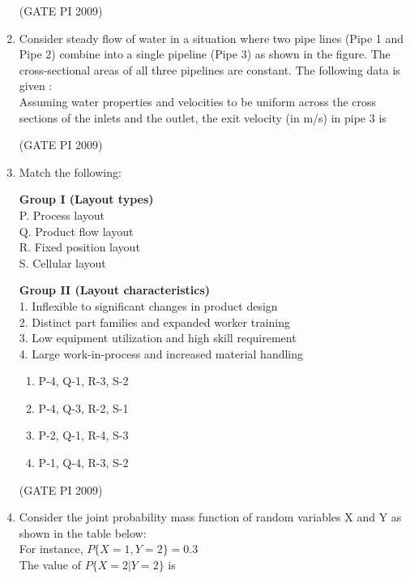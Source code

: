 \documentclass[journal,12pt,onecolumn]{IEEEtran}
\theoremstyle{remark}
\begin{document}
\begin{enumerate}[label=Q.\arabic*]
\hfill (GATE PI 2009)
\item Consider steady flow of water in a situation where two pipe lines (Pipe 1 and Pipe 2) combine into a single pipeline (Pipe 3) as shown in the figure. The cross-sectional areas of all three pipelines are constant. The following data is given : \\

Assuming water properties and velocities to be uniform across the cross sections of the inlets and the outlet, the exit velocity (in m/s) in pipe 3 is
\begin{enumerate}
\end{enumerate}
\hfill (GATE PI 2009)
\item Match the following: \\
\noindent
\begin{minipage}[t]{0.45\textwidth}
\textbf{Group I (Layout types)}\\[0.5em]
P. Process layout \\
Q. Product flow layout \\
R. Fixed position layout \\
S. Cellular layout
\end{minipage}
\hfill
\begin{minipage}[t]{0.9\textwidth}
\textbf{Group II (Layout characteristics)}\\[0.5em]
1. Inflexible to significant changes in product design \\
2. Distinct part families and expanded worker training \\
3. Low equipment utilization and high skill requirement \\
4. Large work-in-process and increased material handling
\end{minipage}

\begin{multicols}{2}
\begin{enumerate}
    \item P-4, Q-1, R-3, S-2
    \item P-4, Q-3, R-2, S-1
    \item P-2, Q-1, R-4, S-3
    \item P-1, Q-4, R-3, S-2
\end{enumerate}
\end{multicols}
\hfill (GATE PI 2009)
\item Consider the joint probability mass function of random variables X and Y as shown in the table below: \\
For instance, $P\{X=1, Y=2\} = 0.3$
$$

$$
The value of $P\{X=2|Y=2\}$ is


\end{enumerate}
\end{document}
